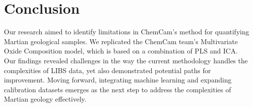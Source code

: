 \section{Conclusion}\label{sec:conclusion}
Our research aimed to identify limitations in ChemCam's method for quantifying Martian geological samples.
We replicated the ChemCam team's Multivariate Oxide Composition model, which is based on a combination of PLS and ICA.
Our findings revealed challenges in the way the current methodology handles the complexities of LIBS data, yet also demonstrated potential paths for improvement.
Moving forward, integrating machine learning and expanding calibration datasets emerges as the next step to address the complexities of Martian geology effectively.